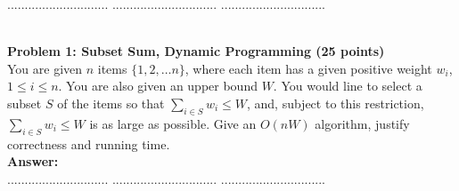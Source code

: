 \documentclass{article}
\begin{document}
\title{
}



\date{}


\newcommand{\DEF}[1]{{\em #1\/}}

\newcommand\chic{\chi_c}
\newcommand\C{\hbox{${\cal C}$}}
\newcommand{\RR}{\mbox{$\mathbb R$}}
\newcommand{\NN}{\mbox{$\mathbb N$}}
\newcommand{\ZZ}{\mbox{$\mathbb Z$}}
\newcommand{\eopf}{\raisebox{0.8ex}{\framebox{}}}
\newcommand{\dist}{\hbox{\rm d}}
\renewcommand\a{\alpha}
\renewcommand\b{\beta}
\renewcommand\c{\gamma}
\renewcommand\d{\delta}
\newcommand\D{\Delta}
\newcommand{\directedchi}{\mbox{$\vec{\chi}$}}
\newcommand{\directedE}{\mbox{$\vec{E}$}}
\newcommand{\directedG}{\mbox{$\vec{G}$}}
\newcommand{\directedK}{\mbox{$\vec{K}$}}

\newenvironment{proof}%
{\noindent{\bf Proof.}\ }%
{\hfill\eopf\par\bigskip}%




 $.............................$
 $..............................$
          $..............................$

\noindent
{}\\

\noindent
{\bf Problem 1: Subset Sum, Dynamic Programming (25 points)}\\
You are given $n$ items $\{ 1 , 2 , \ldots n \}$, where each item has a given positive weight $w_i$, $1\leq i \leq n$. 
You are also given an upper bound $W$. 
You would line to select a subset $S$ of the items so that $\sum_{i\in S}w_i \leq W$, 
and, subject to this restriction,  $\sum_{i\in S}w_i \leq W$ is as large as possible. 
Give an $O(nW)$ algorithm, justify correctness and running time.\\

\noindent
{\bf Answer:}\\

\pagebreak
{} $.............................$
 $..............................$
          $..............................$
\end{document}
